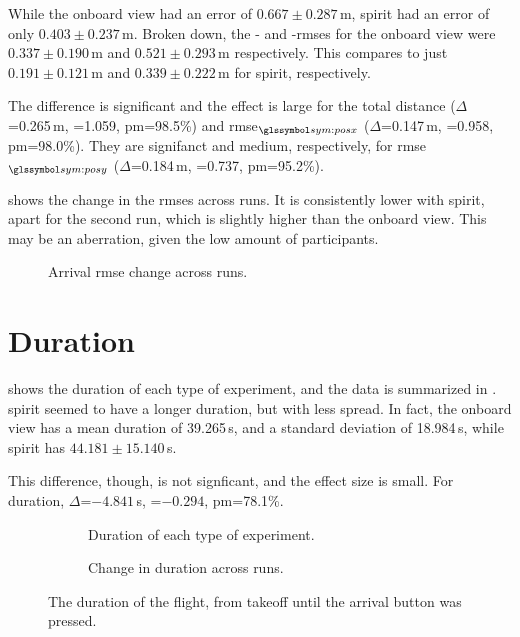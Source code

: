   While the onboard view had an error of $0.667\pm0.287$\,m, \gls{spirit} had an error of only $0.403\pm0.237$\,m.
  Broken down, the - and -\glspl{rmse} for the onboard view were $0.337\pm0.190$\,m and $0.521\pm0.293$\,m respectively.
  This compares to just $0.191\pm0.121$\,m and $0.339\pm0.222$\,m for \gls{spirit}, respectively.
  
  The difference is significant and the effect is large for the total distance ($\Delta$=0.265\,m, =1.059, \gls{pm}=98.5\%) and \gls{rmse}$_{\sym{posx}}$ ($\Delta$=0.147\,m, =0.958, \gls{pm}=98.0\%).
  They are signifanct and medium, respectively, for \gls{rmse}$_{\sym{posy}}$ ($\Delta$=0.184\,m, =0.737, \gls{pm}=95.2\%).

   shows the change in the \glspl{rmse} across runs.
  It is consistently lower with \gls{spirit}, apart for the second run, which is slightly higher than the onboard view.
  This may be an aberration, given the low amount of participants.

  \begin{figure}[h]
    \centering
    
    \caption[Arrival RMS Error across runs]{Arrival \gls{rmse} change across runs.}
    \label{fig:rms_runs}
  \end{figure}

  \section{Duration}
   shows the duration of each type of experiment, and the data is summarized in .
  \gls{spirit} seemed to have a longer duration, but with less spread.
  In fact, the onboard view has a mean duration of 39.265\,s, and a standard deviation of 18.984\,s, while \gls{spirit} has $44.181\pm15.140$\,s.

  This difference, though, is not signficant, and the effect size is small. For duration, $\Delta$=$-4.841$\,s, =$-0.294$, \gls{pm}=78.1\%.
  
  \begin{figure}[h]
    \centering
    \begin{subfigure}[b]{0.45\textwidth}
      
      \caption{Duration of each type of experiment.}
      \label{fig:duration_result}
    \end{subfigure}
    \hfill
    \begin{subfigure}[b]{0.45\textwidth}
      
      \caption{Change in duration across runs.}
      \label{fig:duration_runs}
    \end{subfigure}
    \caption[Duration]{The duration of the flight, from takeoff until the arrival button was pressed.}
    \label{fig:duration}
  \end{figure}

